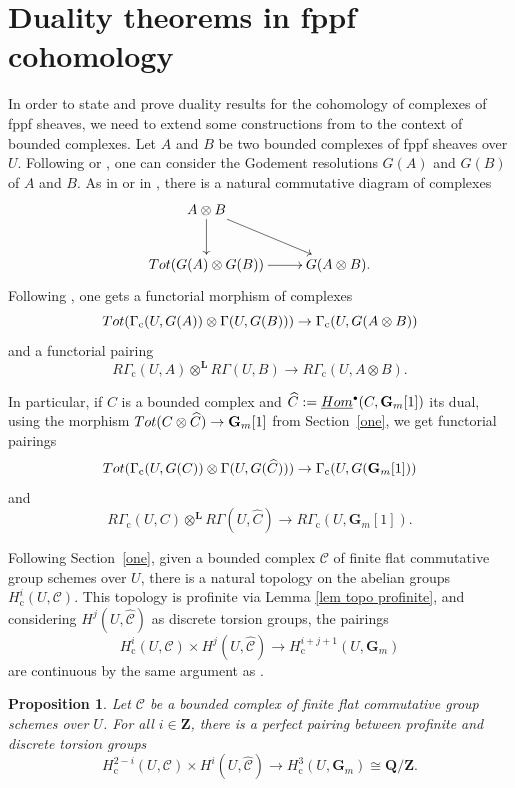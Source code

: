 \documentclass[11pt]{article}
\let\mathcal\mathscr
\newcommand{\sbullet}{{\scriptscriptstyle\bullet}}
\newcommand{\rc}{\mathrm{c}}
\theoremstyle{plain}
\newtheorem{prop}[theo]{Proposition}
\theoremstyle{definition}
\newcommand \ZZ {\mathbf{Z}}
\newcommand \QQ {\mathbf{Q}}
\newcommand \LL {\mathbf{L}}
\newcommand \Gm {\mathbf{G}_m}\let\G\Gm
\newcommand \cC {\mathcal{C}}
\begin{document}
\section{Duality theorems in fppf cohomology} \label{two}

In order to state and prove duality results for the cohomology of complexes of fppf sheaves, we need to extend some constructions from \cite{DemH} to the context of bounded complexes.
Let $A$ and $B$ be two bounded complexes of fppf sheaves over $U$. Following \cite[XVII,\,4.2.9]{SGA4} or \cite[App.\,A]{friedsus}, one can consider the Godement resolutions $G(A)$ and $G(B)$ of $A$ and $B$. As in \cite[II.6.6]{God} or in \cite[App.\,A]{friedsus}, there is a natural commutative diagram of complexes
\[
\xymatrix{
A \otimes B \ar[rd] \ar[d] & \\
\textup{Tot}(G(A) \otimes G(B)) \ar[r] & G(A \otimes B).
}
\]
Following \cite[Proof of Lem.\,4.1]{DemH}, one gets a functorial morphism of complexes
\begin{equation} \label{cup complexes}
\textup{Tot}(\Gamma_\rc(U, G(A)) \otimes \Gamma(U,G(B))) \to \Gamma_\rc(U,G(A \otimes B))
\end{equation}
and a functorial pairing
\[
R\Gamma_\rc(U,A) \otimes^{\LL} R\Gamma(U,B) \to R\Gamma_\rc(U,A \otimes B).
\]

In particular, if $C$ is a bounded complex and $\widehat{C}:= \underline{\textup{Hom}}^\sbullet(C, \Gm[1])$ its dual, using the morphism $\textup{Tot}(C \otimes \widehat{C}) \to \Gm[1]$ from Section~\ref{one}, we get functorial pairings
\[\textup{Tot}(\Gamma_\rc(U, G(C)) \otimes \Gamma(U,G(\widehat{C}))) \to \Gamma_\rc(U,G(\Gm[1]))
\]
and
\begin{equation} \label{pairing derived}
R\Gamma_\rc(U,C) \otimes^{\LL} R\Gamma(U,\widehat{C}) \to R\Gamma_\rc(U,\Gm[1]).
\end{equation}

Following Section~\ref{one}, given a bounded complex $\cC$ of finite flat commutative group schemes over $U$, there is a natural topology on the abelian groups $H^i_\rc(U, \cC)$. This topology is profinite via Lemma \ref{lem topo profinite}, and considering $H^j(U, \widehat{\cC})$ as discrete torsion groups, the pairings
\[
H^i_\rc(U, \cC) \times H^j(U, \widehat{\cC}) \to H^{i+j+1}_\rc(U, \G)
\]
are continuous by the same argument as \cite[Lem.\,4.4]{DemH}.

\begin{prop} \label{AMM complex}
Let $\cC$ be a bounded complex of finite flat commutative group schemes over $U$.
For all $i \in \ZZ$, there is a perfect pairing between profinite and discrete torsion groups\vspace*{-3pt}
\[
H^{2-i}_\rc(U, \cC) \times H^i(U, \widehat{\cC}) \to H^3_\rc(U,\G) \cong \QQ/\ZZ.
\]
\end{prop}
\end{document}
